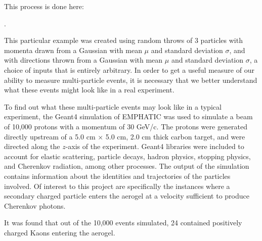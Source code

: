 This process is done here:

 .

This particular example was created using random throws of 3 particles with momenta drawn from a Gaussian with mean $\mu$ and standard deviation $\sigma$, and with directions thrown from a Gaussian with mean $\mu$ and standard deviation $\sigma$, a choice of inputs that is entirely arbitrary. 
In order to get a useful measure of our ability to measure multi-particle events, it is necessary that we better understand what these events might look like in a real experiment.

To find out what these multi-particle events may look like in a typical experiment, the Geant4 simulation of EMPHATIC was used to simulate a beam of 10,000 protons with a momentum of 30 GeV/c.
The protons were generated directly upstream of a 5.0 cm $\times$ 5.0 cm, 2.0 cm thick carbon target, and were directed along the $z$-axis of the experiment.
Geant4 libraries were included to account for elastic scattering, particle decays, hadron physics, stopping physics, and Cherenkov radiation, among other processes. 
The output of the simulation contains information about the identities and trajectories of the particles involved. 
Of interest to this project are specifically the instances where a secondary charged particle enters the aerogel at a velocity sufficient to produce Cherenkov photons.


It was found that out of the 10,000 events simulated, 24 contained positively charged Kaons entering the aerogel.

\endinput

Any text after an \endinput is ignored.
You could put scraps here or things in progress.

